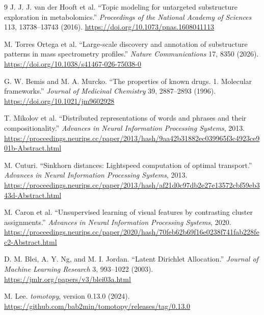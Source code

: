 \documentclass[10pt,a4paper]{article}
\begin{document}
\begin{thebibliography}{9}
J. J. J. van der Hooft et al. ``Topic modeling for untargeted substructure
exploration in metabolomics.'' \emph{Proceedings of the National Academy of
Sciences} 113, 13738--13743 (2016).
\url{https://doi.org/10.1073/pnas.1608041113}

M. Torres Ortega et al. ``Large-scale discovery and annotation of substructure
patterns in mass spectrometry profiles.'' \emph{Nature Communications} 17,
8350 (2026).
\url{https://doi.org/10.1038/s41467-026-75038-0}

G. W. Bemis and M. A. Murcko. ``The properties of known drugs. 1. Molecular
frameworks.'' \emph{Journal of Medicinal Chemistry} 39, 2887--2893 (1996).
\url{https://doi.org/10.1021/jm9602928}

T. Mikolov et al. ``Distributed representations of words and phrases and their
compositionality.'' \emph{Advances in Neural Information Processing Systems},
2013. \url{https://proceedings.neurips.cc/paper/2013/hash/9aa42b31882ec039965f3c4923ce901b-Abstract.html}

M. Cuturi. ``Sinkhorn distances: Lightspeed computation of optimal transport.''
\emph{Advances in Neural Information Processing Systems}, 2013.
\url{https://proceedings.neurips.cc/paper/2013/hash/af21d0c97db2e27e13572cbf59eb343d-Abstract.html}

M. Caron et al. ``Unsupervised learning of visual features by contrasting
cluster assignments.'' \emph{Advances in Neural Information Processing
Systems}, 2020. \url{https://proceedings.neurips.cc/paper/2020/hash/70feb62b69f16e0238f741fab228fec2-Abstract.html}

D. M. Blei, A. Y. Ng, and M. I. Jordan. ``Latent Dirichlet Allocation.''
\emph{Journal of Machine Learning Research} 3, 993--1022 (2003).
\url{https://jmlr.org/papers/v3/blei03a.html}

M. Lee. \emph{tomotopy}, version 0.13.0 (2024).
\url{https://github.com/bab2min/tomotopy/releases/tag/0.13.0}
\end{thebibliography}
\end{document}
